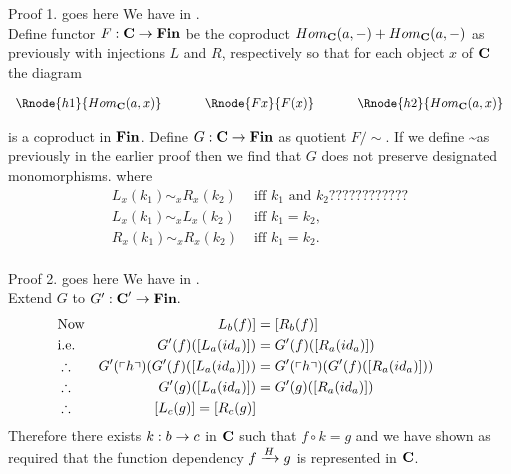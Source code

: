 \begin{frame}{Proof 1. goes here}
We have \fgsourcediagram in \catc.\\
\medskip
Define functor $F: \catc \morph \Fin$ be the coproduct $Hom_{\catc}(a,-) + Hom_{\catc}(a,-)$
as previously with injections $L$ and $R$, respectively so that
for each object $x$ of $\catc$ the diagram
\begin{center}
$
\begin{array}{c p{0.5cm} c p{0.5cm} c  }
\Rnode{h1}{Hom_{\catc}(a,x)}  &&\Rnode{Fx}{F(x)}  &&   \Rnode{h2}{Hom_{\catc}(a,x)}       
\end{array} 
$
\end{center}
is a coproduct in $\Fin$.
\medskip
Define $G: \catc \morph \Fin$ as quotient $F/\sim$.
If we define \sim as previously in the earlier proof then we find that $G$ does not preserve 
designated monomorphisms. 
 where
\begin{align*}
L_x(k_1) \sim_x R_x(k_2) & \mbox{ iff  $k_1$ and $k_2$????????????}\\
L_x(k_1) \sim_x L_x(k_2) & \mbox{ iff $k_1 = k_2$,} \\
R_x(k_1) \sim_x R_x(k_2) & \mbox{ iff $k_1 = k_2$.} \\
\end{align*} 
\end{frame}

\begin{frame}{Proof 2. goes here}
We have   in \catcp.\\
\medskip
Extend $G$ to $G':\catcp \morph \Fin.$ \\

\medskip
\begin{align*}
&\mbox{Now} & L_b(f)]                         &= [R_b(f)]                 \\
&\mbox{i.e.}& G'(f)([L_a(id_a)])              &= G'(f)([R_a(id_a)])       \\
&\therefore & G'(\qq{h}) (G'(f)([L_a(id_a)])) &= G'(\qq{h}) (G'(f)([R_a(id_a)])) \\
&\therefore & G'(g)([L_a(id_a)])              &= G'(g)([R_a(id_a)]) & &    \\
&\therefore & [L_c(g)] = [R_c(g)] 
\end{align*}
Therefore there exists $k:b \morph c$ in 
$\catc$ such that $f \circ k = g$ and we have shown as required that the function dependency
$\fundep{H}{f}{g}$ is represented in $\catc$.
\end{frame}

